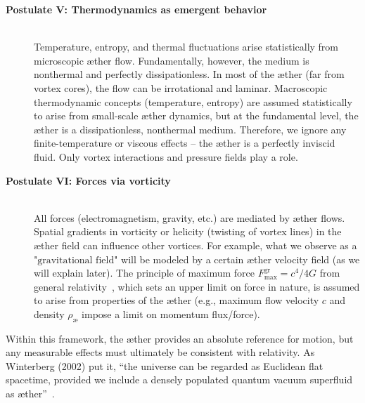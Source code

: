 \begin{description}
    \item[\textbf{Postulate V: Thermodynamics as emergent behavior}] \hfill \\
    Temperature, entropy, and thermal fluctuations arise statistically from microscopic æther flow. Fundamentally, however, the medium is nonthermal and perfectly dissipationless. In most of the æther (far from vortex cores), the flow can be irrotational and laminar. Macroscopic thermodynamic concepts (temperature, entropy) are assumed statistically to arise from small-scale æther dynamics, but at the fundamental level, the æther is a dissipationless, nonthermal medium. Therefore, we ignore any finite-temperature or viscous effects – the æther is a perfectly inviscid fluid. Only vortex interactions and pressure fields play a role.

    \item[\textbf{Postulate VI: Forces via vorticity}] \hfill \\
    All forces (electromagnetism, gravity, etc.) are mediated by æther flows.
    Spatial gradients in vorticity or helicity (twisting of vortex lines) in the æther field can influence other vortices. For example, what we observe as a $\text{"gravitational field"}$ will be modeled by a certain æther velocity field (as we will explain later). The principle of maximum force $ F^{\text{gr}}_{\text{max}} = c^4 / 4 G $ from general relativity~\cite{Schiller2022-maxforce}, which sets an upper limit on force in nature, is assumed to arise from properties of the æther (e.g., maximum flow velocity $c$ and density $\rho_\text{\ae}$ impose a limit on momentum flux/force).
\end{description}

Within this framework, the æther provides an absolute reference for motion, but any measurable effects must ultimately be consistent with relativity. As Winterberg (2002) put it, ``the universe can be regarded as Euclidean flat spacetime, provided we include a densely populated quantum vacuum superfluid as æther''~\cite{Winterberg2002-PlanckÆther}.

